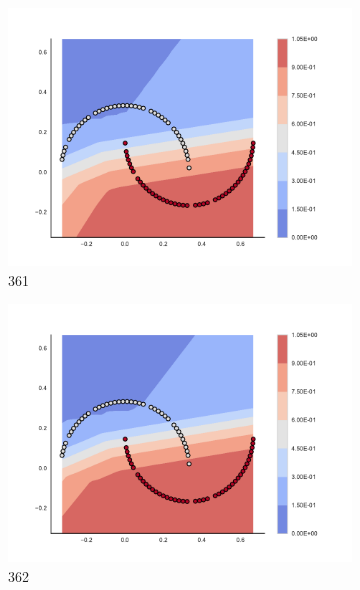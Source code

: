 \begin{figure}[h]
\begin{subfigure}[b]{0.09\textwidth}
    \includegraphics[clip, trim=2.35cm 1.75cm 4.5cm 0cm,width=\textwidth]{img/convergence/361.pdf}
    \caption{361}
    \label{fig:convergence_361}
\end{subfigure}
%
\begin{subfigure}[b]{0.09\textwidth}
    \includegraphics[clip, trim=2.35cm 1.75cm 4.5cm 0cm,width=\textwidth]{img/convergence/362.pdf}
    \caption{362}
    \label{fig:convergence_362}
\end{subfigure}
%
\begin{subfigure}[b]{0.09\textwidth}

\end{subfigure}
\end{figure}
